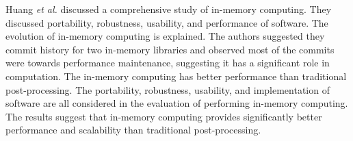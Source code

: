 \documentclass[journal, a4paper]{IEEEtran}
\begin{document}
	Huang \textit{et al.} \cite{HUANG2022106} discussed a comprehensive study of in-memory computing.	They discussed portability, robustness, usability, and performance of software. The evolution of in-memory computing is explained. The authors suggested they commit history for two in-memory libraries and observed most of the commits	were towards performance maintenance, suggesting it has a significant role in computation. The in-memory computing has better performance than traditional post-processing. The portability, robustness, usability, and implementation of software are all considered in the evaluation of performing in-memory computing. The results suggest that in-memory computing provides significantly better performance and scalability than traditional post-processing.
	
	\begin{table}[]
		\centering
		\begin{tabular}{ | p{0.7cm} | p{1cm} | p{2.5cm} | p{2.5cm} | p{2.5cm} |  p{2.5cm} |p{2.5cm} | }
			

\end{tabular}
\end{table}
\end{document}
